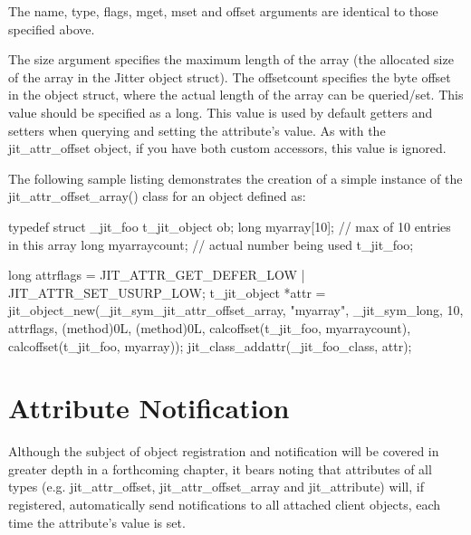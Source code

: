 The name, type, flags, mget, mset and offset arguments are identical to those specified above.

The size argument specifies the maximum length of the array (the allocated size of the array in the Jitter object struct). The offsetcount specifies the byte offset in the object struct, where the actual length of the array can be queried/set. This value should be specified as a long. This value is used by default getters and setters when querying and setting the attribute's value. As with the jit\_\-attr\_\-offset object, if you have both custom accessors, this value is ignored.

The following sample listing demonstrates the creation of a simple instance of the jit\_\-attr\_\-offset\_\-array() class for an object defined as:


\begin{DoxyCode}
typedef struct _jit_foo
{
   t_jit_object     ob;
   long             myarray[10]; // max of 10 entries in this array
   long             myarraycount; // actual number being used
} t_jit_foo;

long attrflags = JIT_ATTR_GET_DEFER_LOW | JIT_ATTR_SET_USURP_LOW;
t_jit_object *attr = jit_object_new(_jit_sym_jit_attr_offset_array, "myarray", 
   _jit_sym_long, 10, attrflags, (method)0L, (method)0L, 
   calcoffset(t_jit_foo, myarraycount), calcoffset(t_jit_foo, myarray));
jit_class_addattr(_jit_foo_class, attr);
\end{DoxyCode}
\hypertarget{chapter_jit_objectmodel_chapter_jit_objectmodel_attrnotifications}{}\section{Attribute Notification}\label{chapter_jit_objectmodel_chapter_jit_objectmodel_attrnotifications}
Although the subject of object registration and notification will be covered in greater depth in a forthcoming chapter, it bears noting that attributes of all types (e.g. jit\_\-attr\_\-offset, jit\_\-attr\_\-offset\_\-array and jit\_\-attribute) will, if registered, automatically send notifications to all attached client objects, each time the attribute's value is set. 